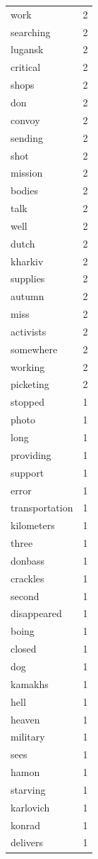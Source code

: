\begin{tabular}{lr}
work & 2 \\
searching & 2 \\
lugansk & 2 \\
critical & 2 \\
shops & 2 \\
don & 2 \\
convoy & 2 \\
sending & 2 \\
shot & 2 \\
mission & 2 \\
bodies & 2 \\
talk & 2 \\
well & 2 \\
dutch & 2 \\
kharkiv & 2 \\
supplies & 2 \\
autumn & 2 \\
miss & 2 \\
activists & 2 \\
somewhere & 2 \\
working & 2 \\
picketing & 2 \\
stopped & 1 \\
photo & 1 \\
long & 1 \\
providing & 1 \\
support & 1 \\
error & 1 \\
transportation & 1 \\
kilometers & 1 \\
three & 1 \\
donbass & 1 \\
crackles & 1 \\
second & 1 \\
disappeared & 1 \\
boing & 1 \\
closed & 1 \\
dog & 1 \\
kamakhs & 1 \\
hell & 1 \\
heaven & 1 \\
military & 1 \\
sees & 1 \\
hamon & 1 \\
starving & 1 \\
karlovich & 1 \\
konrad & 1 \\
delivers & 1 \\

\end{tabular}
